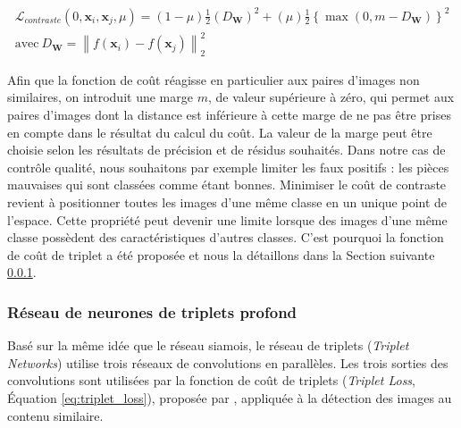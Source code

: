 \begin{equation} \label{eq:contrastive_loss}
\begin{split}
\mathcal{L}_{contraste}(0, \mathbf{x}_i, \mathbf{x}_j, \mu) = (1-\mu) \frac{1}{2}\left(D_{\mathbf{W}}\right)^{2}+(\mu) \frac{1}{2}\left\{\max \left(0, m-D_{\mathbf{W}}\right)\right\}^{2}
\\
\text{avec} \ D_{\mathbf{W}} = \left\|f(\mathbf{x}_i) - f(\mathbf{x}_j)\right\|^{2}_{2}
\end{split}
\end{equation}

Afin que la fonction de coût réagisse en particulier aux paires d'images non similaires, on introduit une marge $m$, de valeur supérieure à zéro, qui permet aux paires d'images dont la distance est inférieure à cette marge de ne pas être prises en compte dans le résultat du calcul du coût.
La valeur de la marge peut être choisie selon les résultats de précision et de résidus souhaités.
Dans notre cas de contrôle qualité, nous souhaitons par exemple limiter les faux positifs : les pièces mauvaises qui sont classées comme étant bonnes.
Minimiser le coût de contraste revient à positionner toutes les images d'une même classe en un unique point de l'espace.
Cette propriété peut devenir une limite lorsque des images d'une même classe possèdent des caractéristiques d'autres classes.
C'est pourquoi la fonction de coût de triplet a été proposée et nous la détaillons dans la Section suivante \ref{subsubsec:triplet}.


\subsubsection{Réseau de neurones de triplets profond} \label{subsubsec:triplet}
Basé sur la même idée que le réseau siamois, le réseau de triplets (\textit{Triplet Networks}) utilise trois réseaux de convolutions en parallèles.
Les trois sorties des convolutions sont utilisées par la fonction de coût de triplets (\textit{Triplet Loss}, Équation \ref{eq:triplet_loss}), proposée par \cite{wang_learning_2014} \citeauthor{wang_learning_2014}, appliquée à la détection des images au contenu similaire.


